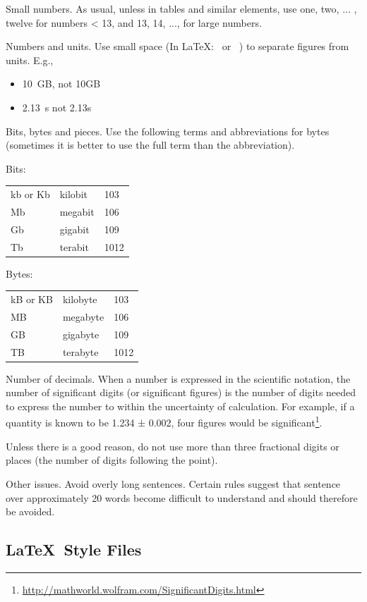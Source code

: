 Small numbers. As usual, unless in tables and similar elements, use {one, two, ... , twelve} for numbers < 13, and {13, 14, ..., } for large numbers.

Numbers and units. Use small space (In \LaTeX: \, or ~) to separate figures from units. E.g.,

\begin{itemize}
    \item 10~GB, not 10GB
    \item 2.13~s not 2.13s
\end{itemize}

Bits, bytes and pieces. Use the following terms and abbreviations for bytes (sometimes it is better to use the full term than the abbreviation).

Bits:\\
\begin{tabular}{lll}
    kb or Kb&	kilobit&	103\\ 
    Mb&	megabit&	106\\ 
    Gb&	gigabit&	109\\ 
    Tb&	terabit&	1012\\ 
\end{tabular}

Bytes:\\
\begin{tabular}{lll}
    kB or KB&	kilobyte&	103\\ 
    MB&	megabyte&106\\ 
    GB	&gigabyte	&109\\ 
    TB	&terabyte	&1012\\ 
\end{tabular}

Number of decimals. When a number is expressed in the scientific notation, the number of significant digits (or significant figures) is the number of digits needed to express the number to within the uncertainty of calculation. For example, if a quantity is known to be 1.234 ± 0.002, four figures would be significant\footnote{\url{http://mathworld.wolfram.com/SignificantDigits.html}}.

Unless there is a good reason, do not use more than three fractional digits or places (the number of digits following the point).

Other issues. Avoid overly long sentences. Certain rules suggest that sentence over approximately 20 words become difficult to understand and should therefore be avoided. 

\subsection{\LaTeX\ Style Files}
\label{sec:latex-style-files}

